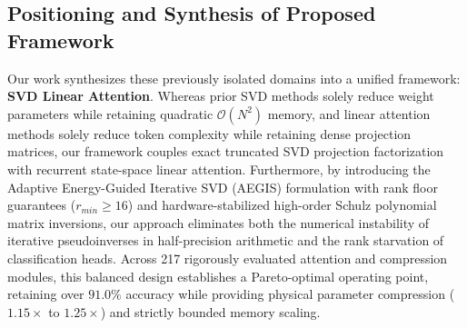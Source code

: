 \subsection{Positioning and Synthesis of Proposed Framework}
Our work synthesizes these previously isolated domains into a unified framework: \textbf{SVD Linear Attention}. Whereas prior SVD methods solely reduce weight parameters while retaining quadratic $\mathcal{O}(N^2)$ memory, and linear attention methods solely reduce token complexity while retaining dense projection matrices, our framework couples exact truncated SVD projection factorization with recurrent state-space linear attention. Furthermore, by introducing the Adaptive Energy-Guided Iterative SVD (AEGIS) formulation with rank floor guarantees ($r_{min} \ge 16$) and hardware-stabilized high-order Schulz polynomial matrix inversions, our approach eliminates both the numerical instability of iterative pseudoinverses in half-precision arithmetic and the rank starvation of classification heads. Across 217 rigorously evaluated attention and compression modules, this balanced design establishes a Pareto-optimal operating point, retaining over $91.0\%$ accuracy while providing physical parameter compression ($1.15\times$ to $1.25\times$) and strictly bounded memory scaling.
